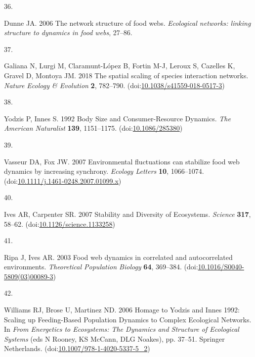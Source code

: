 \documentclass[
]{article}
\newlength{\cslhangindent}
\newlength{\csllabelwidth}
\newlength{\cslentryspacingunit} %
\newenvironment{CSLReferences}[2] %
 {%
  \setlength{\parindent}{0pt}
  \ifodd #1
  \let\oldpar\par
  \def\par{\hangindent=\cslhangindent\oldpar}
  \fi
  \setlength{\parskip}{#2\cslentryspacingunit}
 }%
 {}
\newcommand{\CSLLeftMargin}[1]{\parbox[t]{\csllabelwidth}{#1}}
\newcommand{\CSLRightInline}[1]{\parbox[t]{\linewidth - \csllabelwidth}{#1}\break}
\begin{document}
\begin{CSLReferences}{0}{0}
\leavevmode{}%
\CSLLeftMargin{36. }%
\CSLRightInline{Dunne JA. 2006 The network structure of food webs. \emph{Ecological networks: linking structure to dynamics in food webs}, 27--86.}

\leavevmode{}%
\CSLLeftMargin{37. }%
\CSLRightInline{Galiana N, Lurgi M, Claramunt-López B, Fortin M-J, Leroux S, Cazelles K, Gravel D, Montoya JM. 2018 The spatial scaling of species interaction networks. \emph{Nature Ecology \& Evolution} \textbf{2}, 782--790. (doi:\href{https://doi.org/10.1038/s41559-018-0517-3}{10.1038/s41559-018-0517-3})}

\leavevmode{}%
\CSLLeftMargin{38. }%
\CSLRightInline{Yodzis P, Innes S. 1992 Body {Size} and {Consumer}-{Resource} {Dynamics}. \emph{The American Naturalist} \textbf{139}, 1151--1175. (doi:\href{https://doi.org/10.1086/285380}{10.1086/285380})}

\leavevmode{}%
\CSLLeftMargin{39. }%
\CSLRightInline{Vasseur DA, Fox JW. 2007 Environmental fluctuations can stabilize food web dynamics by increasing synchrony. \emph{Ecology Letters} \textbf{10}, 1066--1074. (doi:\href{https://doi.org/10.1111/j.1461-0248.2007.01099.x}{10.1111/j.1461-0248.2007.01099.x})}

\leavevmode{}%
\CSLLeftMargin{40. }%
\CSLRightInline{Ives AR, Carpenter SR. 2007 Stability and {Diversity} of {Ecosystems}. \emph{Science} \textbf{317}, 58--62. (doi:\href{https://doi.org/10.1126/science.1133258}{10.1126/science.1133258})}

\leavevmode{}%
\CSLLeftMargin{41. }%
\CSLRightInline{Ripa J, Ives AR. 2003 Food web dynamics in correlated and autocorrelated environments. \emph{Theoretical Population Biology} \textbf{64}, 369--384. (doi:\href{https://doi.org/10.1016/S0040-5809(03)00089-3}{10.1016/S0040-5809(03)00089-3})}

\leavevmode{}%
\CSLLeftMargin{42. }%
\CSLRightInline{Williams RJ, Brose U, Martinez ND. 2006 Homage to {Yodzis} and {Innes} 1992: {Scaling} up {Feeding}-{Based} {Population} {Dynamics} to {Complex} {Ecological} {Networks}. In \emph{From {Energetics} to {Ecosystems}: {The} {Dynamics} and {Structure} of {Ecological} {Systems}} (eds N Rooney, KS McCann, DLG Noakes), pp. 37--51. Springer Netherlands. (doi:\href{https://doi.org/10.1007/978-1-4020-5337-5_2}{10.1007/978-1-4020-5337-5\_2})}


\end{CSLReferences}
\end{document}
